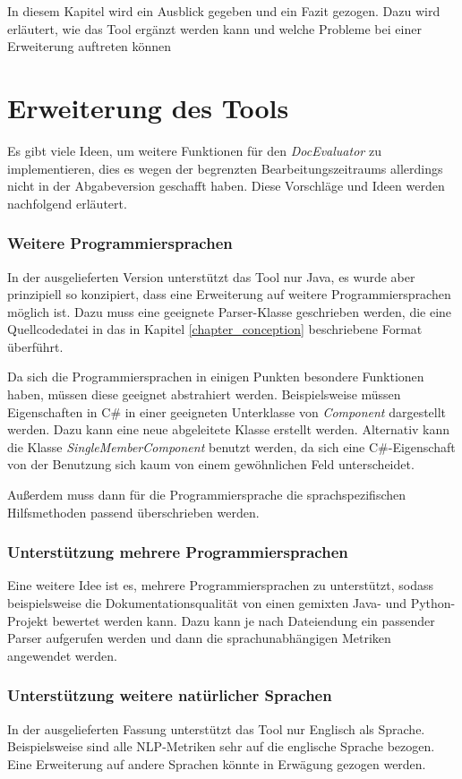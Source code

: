 In diesem Kapitel wird ein Ausblick gegeben und ein Fazit gezogen. Dazu wird erläutert, wie das Tool ergänzt werden kann und welche Probleme bei einer Erweiterung auftreten können
\section{Erweiterung des Tools}
Es gibt viele Ideen, um weitere Funktionen für den \textit{DocEvaluator} zu implementieren, dies es wegen der begrenzten Bearbeitungszeitraums allerdings nicht in der Abgabeversion geschafft haben. Diese Vorschläge und Ideen werden nachfolgend erläutert.
\subsubsection{Weitere Programmiersprachen}
In der ausgelieferten Version unterstützt das Tool nur Java, es wurde aber prinzipiell so konzipiert, dass eine Erweiterung auf weitere Programmiersprachen möglich ist. Dazu muss eine geeignete Parser-Klasse geschrieben werden, die eine Quellcodedatei in das in Kapitel \ref{chapter_conception} beschriebene Format überführt. 

Da sich die Programmiersprachen in einigen Punkten besondere Funktionen haben, müssen diese geeignet abstrahiert werden. Beispielsweise müssen Eigenschaften in C\# in einer geeigneten Unterklasse von \textit{Component} dargestellt werden. Dazu kann eine neue abgeleitete Klasse erstellt werden. Alternativ kann die Klasse \textit{SingleMemberComponent}  benutzt werden, da sich eine C\#-Eigenschaft von der Benutzung sich kaum von einem gewöhnlichen Feld unterscheidet.

Außerdem muss dann für die Programmiersprache die sprachspezifischen Hilfsmethoden passend überschrieben werden.

\subsubsection{Unterstützung mehrere Programmiersprachen}
Eine weitere Idee ist es, mehrere Programmiersprachen zu unterstützt, sodass  beispielsweise die Dokumentationsqualität von einen gemixten Java- und Python-Projekt bewertet werden kann. Dazu kann je nach Dateiendung ein passender Parser aufgerufen werden und dann die sprachunabhängigen Metriken angewendet werden.

\subsubsection{Unterstützung weitere natürlicher Sprachen}
In der ausgelieferten Fassung unterstützt das Tool nur Englisch als Sprache. Beispielsweise sind alle \ac{NLP}-Metriken sehr auf die englische Sprache bezogen. Eine Erweiterung auf andere Sprachen könnte in Erwägung gezogen werden. 


